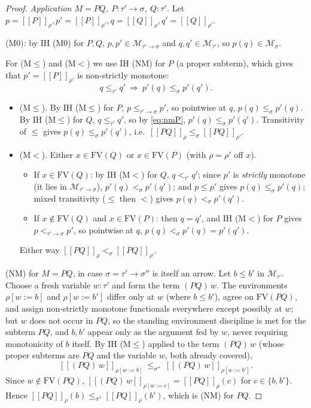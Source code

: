 \documentclass{amsart}
\theoremstyle{definition}
\newcommand{\interp}[1]{[\![#1]\!]}
\newcommand{\FV}{\mathrm{FV}}
\begin{document}
\begin{proof}
\medskip\noindent\emph{Application $M=PQ$, $P:\tau'\to\sigma$, $Q:\tau'$.}
Let $p=\interp{P}_\rho,p'=\interp{P}_{\rho'},q=\interp{Q}_\rho,q'=\interp{Q}_{\rho'}$.

(M0): by IH \textup{(M0)} for $P,Q$, $p,p'\in\mathcal M_{\tau'\to\sigma}$ and
$q,q'\in\mathcal M_{\tau'}$, so $p(q)\in\mathcal M_\sigma$.

For (M$\le$) and (M$<$) we use IH \textup{(NM)} for $P$ (a proper subterm), which gives that
$p'=\interp{P}_{\rho'}$ is non-strictly monotone:
\begin{equation}\label{eq:nmP}
  q\le_{\tau'}q'\ \Longrightarrow\ p'(q)\le_\sigma p'(q').
\end{equation}
\begin{itemize}
\item (M$\le$). By IH \textup{(M$\le$)} for $P$, $p\le_{\tau'\to\sigma}p'$, so pointwise at
  $q$, $p(q)\le_\sigma p'(q)$. By IH \textup{(M$\le$)} for $Q$, $q\le_{\tau'}q'$, so by
  \eqref{eq:nmP}, $p'(q)\le_\sigma p'(q')$. Transitivity of $\le$ gives
  $p(q)\le_\sigma p'(q')$, i.e.\ $\interp{PQ}_\rho\le_\sigma\interp{PQ}_{\rho'}$.
\item (M$<$). Either $x\in\FV(Q)$ or $x\in\FV(P)$ (with $\rho=\rho'$ off $x$).
  \begin{itemize}
  \item If $x\in\FV(Q)$: by IH \textup{(M$<$)} for $Q$, $q<_{\tau'}q'$; since $p'$ is
    \emph{strictly} monotone (it lies in $\mathcal M_{\tau'\to\sigma}$), $p'(q)<_\sigma p'(q')$;
    and $p\le p'$ gives $p(q)\le_\sigma p'(q)$; mixed transitivity ($\le$ then $<$) gives
    $p(q)<_\sigma p'(q')$.
  \item If $x\notin\FV(Q)$ and $x\in\FV(P)$: then $q=q'$, and IH \textup{(M$<$)} for $P$
    gives $p<_{\tau'\to\sigma}p'$, so pointwise at $q$, $p(q)<_\sigma p'(q)=p'(q')$.
  \end{itemize}
  Either way $\interp{PQ}_\rho<_\sigma\interp{PQ}_{\rho'}$.
\end{itemize}

(NM) for $M=PQ$, in case $\sigma=\tau'\to\sigma''$ is itself an arrow. Let $b\le b'$ in
$\mathcal M_{\tau'}$. Choose a fresh variable $w:\tau'$ and form the term $(PQ)\,w$. The
environments $\rho[w:=b]$ and $\rho[w:=b']$ differ only at $w$ (where $b\le b'$), agree on
$\FV(PQ)$, and assign non-strictly monotone functionals everywhere except possibly at $w$;
but $w$ does not occur in $PQ$, so the standing environment discipline is met for the
subterm $PQ$, and $b,b'$ appear only as the argument fed by $w$, never requiring
monotonicity of $b$ itself. By IH \textup{(M$\le$)} applied to the term $(PQ)\,w$ (whose
proper subterms are $PQ$ and the variable $w$, both already covered), 
\[
  \interp{(PQ)\,w}_{\rho[w:=b]}\ \le_{\sigma''}\ \interp{(PQ)\,w}_{\rho[w:=b']}.
\]
Since $w\notin\FV(PQ)$, $\interp{(PQ)\,w}_{\rho[w:=c]}=\interp{PQ}_\rho(c)$ for $c\in\{b,b'\}$.
Hence $\interp{PQ}_\rho(b)\le_{\sigma''}\interp{PQ}_\rho(b')$, which is (NM) for $PQ$.
\end{proof}
\end{document}
